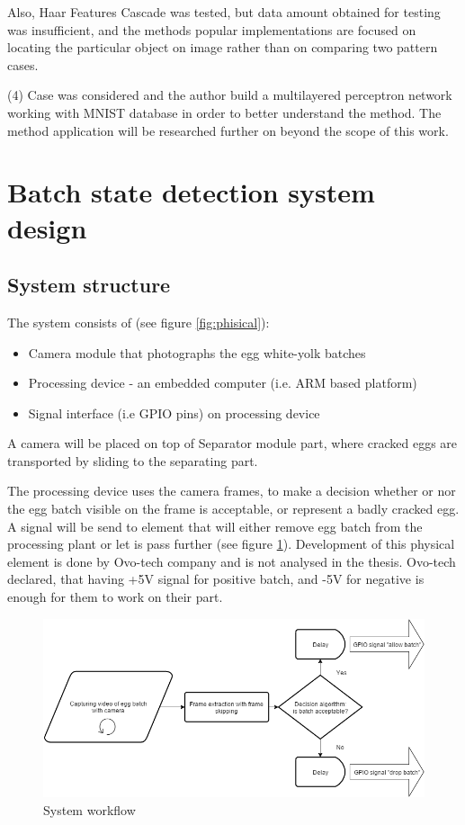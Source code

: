 \documentclass[12pt,twoside,a4paper]{article}
\begin{document}
Also, Haar Features Cascade was tested, but data amount obtained for testing was insufficient, and the methods popular implementations are focused on locating the particular object on image rather than on comparing two pattern cases.

(4) Case was considered and the author build a multilayered perceptron network working with MNIST database in order to better understand the method.
The method application will be researched further on beyond the scope of this work.






\section{Batch state detection system design}

\subsection{System structure}
The system consists of (see figure \ref{fig:phisical}):
\begin{itemize}
\item Camera module that photographs the egg white-yolk batches
\item Processing device - an embedded computer (i.e. ARM based platform)
\item Signal interface (i.e GPIO pins) on processing device
\end{itemize}

A camera will be placed on top of Separator module part, where cracked eggs are transported by sliding to the separating part.

The processing device uses the camera frames, to make a decision whether or nor the egg batch visible on the frame is acceptable, or represent a badly cracked egg.
A signal will be send to element that will either remove egg batch from the processing plant or let is pass further (see figure \ref{fig:system}).
Development of this physical element is done by Ovo-tech company and is not analysed in the thesis. Ovo-tech declared, that having +5V signal for positive batch, and -5V for negative is enough for them to work on their part.


\begin{figure}[H]
\centering
\includegraphics[width=0.8\paperwidth]{system}
\caption{System workflow}\label{fig:system}
\end{figure}
\end{document}
